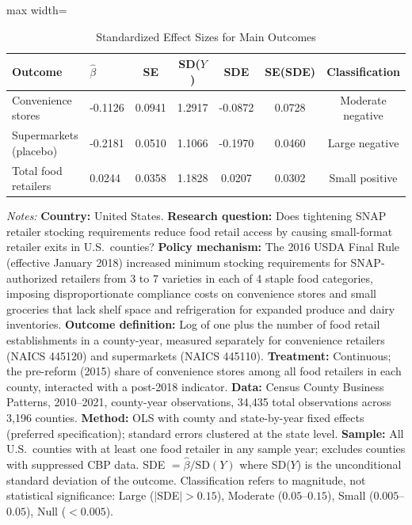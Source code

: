 
\begin{table}[H]
\centering
\caption{Standardized Effect Sizes for Main Outcomes}
\label{tab:sde}
\begin{adjustbox}{max width=\textwidth}
\begin{threeparttable}
\begin{tabular}{llccccc}
\toprule
Outcome & $\hat{\beta}$ & SE & SD($Y$) & SDE & SE(SDE) & Classification \\
\midrule
Convenience stores & -0.1126 & 0.0941 & 1.2917 & -0.0872 & 0.0728 & Moderate negative \\
Supermarkets (placebo) & -0.2181 & 0.0510 & 1.1066 & -0.1970 & 0.0460 & Large negative \\
Total food retailers & 0.0244 & 0.0358 & 1.1828 & 0.0207 & 0.0302 & Small positive \\
\bottomrule
\end{tabular}
\begin{tablenotes}[flushleft]
\small
\item \textit{Notes:} \footnotesize \textbf{Country:} United States. \textbf{Research question:} Does tightening SNAP retailer stocking requirements reduce food retail access by causing small-format retailer exits in U.S.\ counties? \textbf{Policy mechanism:} The 2016 USDA Final Rule (effective January 2018) increased minimum stocking requirements for SNAP-authorized retailers from 3 to 7 varieties in each of 4 staple food categories, imposing disproportionate compliance costs on convenience stores and small groceries that lack shelf space and refrigeration for expanded produce and dairy inventories. \textbf{Outcome definition:} Log of one plus the number of food retail establishments in a county-year, measured separately for convenience retailers (NAICS 445120) and supermarkets (NAICS 445110). \textbf{Treatment:} Continuous; the pre-reform (2015) share of convenience stores among all food retailers in each county, interacted with a post-2018 indicator. \textbf{Data:} Census County Business Patterns, 2010--2021, county-year observations, 34,435 total observations across 3,196 counties. \textbf{Method:} OLS with county and state-by-year fixed effects (preferred specification); standard errors clustered at the state level. \textbf{Sample:} All U.S.\ counties with at least one food retailer in any sample year; excludes counties with suppressed CBP data. SDE $= \hat{\beta} / \text{SD}(Y)$ where SD($Y$) is the unconditional standard deviation of the outcome. Classification refers to magnitude, not statistical significance: Large ($|$SDE$| > 0.15$), Moderate ($0.05$--$0.15$), Small ($0.005$--$0.05$), Null ($< 0.005$).
\end{tablenotes}
\end{threeparttable}
\end{adjustbox}
\end{table}


